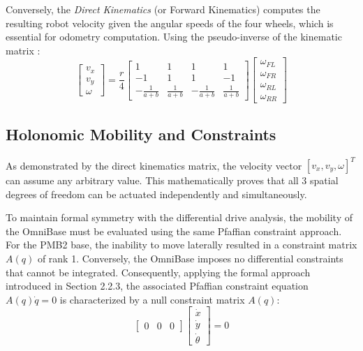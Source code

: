 Conversely, the \emph{Direct Kinematics} (or Forward Kinematics) computes the resulting robot velocity given the angular speeds of the four wheels, which is essential for odometry computation. Using the pseudo-inverse of the kinematic matrix \cite{taheri_kinematic_2015}:
\begin{equation}
    \begin{bmatrix}
        v_x \\ v_y \\ \omega
    \end{bmatrix}
    = \frac{r}{4}
    \begin{bmatrix}
         1 &  1 &  1 &  1 \\
        -1 &  1 &  1 & -1 \\
        -\frac{1}{a+b} & \frac{1}{a+b} & -\frac{1}{a+b} & \frac{1}{a+b}
    \end{bmatrix}
    \begin{bmatrix}
        \omega_{FL} \\ \omega_{FR} \\ \omega_{RL} \\ \omega_{RR}
    \end{bmatrix}
\end{equation}

\subsection{Holonomic Mobility and Constraints}
\label{subsec:holonomic_mobility}
As demonstrated by the direct kinematics matrix, the velocity vector $[v_x, v_y, \omega]^T$ can assume any arbitrary value. This mathematically proves that all 3 spatial degrees of freedom can be actuated independently and simultaneously.

To maintain formal symmetry with the differential drive analysis, the mobility of the OmniBase must be evaluated using the same Pfaffian constraint approach. For the PMB2 base, the inability to move laterally resulted in a constraint matrix $A(q)$ of rank 1. Conversely, the OmniBase imposes no differential constraints that cannot be integrated. Consequently, applying the formal approach introduced in Section 2.2.3, the associated Pfaffian constraint equation $A(q)\dot{q} = 0$ is characterized by a null constraint matrix $A(q)$:
\begin{equation}
    \begin{bmatrix} 0 & 0 & 0 \end{bmatrix} 
    \begin{bmatrix} \dot{x} \\ \dot{y} \\ \dot{\theta} \end{bmatrix} = 0
\end{equation}


